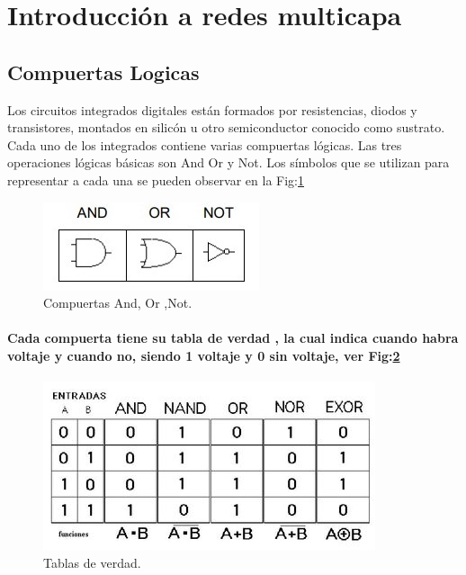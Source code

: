 \documentclass[10pt,a4paper]{article}
\begin{document}
{\begin{center}
\par\vspace{1.5cm}

\end{center}
\clearpage

}

\printindex

\section{
Introducci\'on a redes multicapa
}
\subsection{Compuertas Logicas}
Los circuitos integrados digitales est\'an formados por resistencias, diodos y
transistores, montados en silic\'on u otro semiconductor conocido como sustrato.
Cada uno de los integrados contiene varias compuertas l\'ogicas.
Las tres operaciones l\'ogicas b\'asicas son And Or y Not.
Los s\'imbolos que se utilizan para representar a cada una se pueden observar en la Fig:\ref{fig:Compuertas}


\begin{figure}[H]
\includegraphics[scale=1] {compuertas.jpg}
\caption{Compuertas And, Or ,Not.}
\label{fig:Compuertas}
\end{figure}

\paragraph{Cada compuerta tiene su tabla de verdad , la cual indica cuando habra voltaje y cuando no, siendo 1 voltaje y 0 sin voltaje, ver Fig:\ref{fig:tablas}}

\begin{figure}[H]
\includegraphics[scale=0.7] {tablas.jpg}
\caption{Tablas de verdad.}
\label{fig:tablas}
\end{figure}
\end{document}
